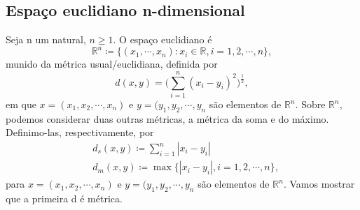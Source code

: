 \documentclass{article}
\begin{document}
\subsection{Espaço euclidiano n-dimensional}
  Seja n um natural, \(n\geq 1.\) O espaço euclidiano é 
    \[
      \mathbb{R}^{n}\coloneqq \{(x_{1}, \cdots, x_{n}): x_{i}\in \mathbb{R}, i = 1, 2, \cdots, n\},
    \]
    munido da métrica usual/euclidiana, definida por 
      \[
        d(x, y) = \biggl(\sum\limits_{i=1}^{n}(x_{i}-y_{i})^{2}\biggr)^{\frac{1}{2}},
      \]
      em que \(x=(x_{1}, x_{2}, \cdots, x_{n})\) e \(y = (y_{1}, y_{2}, \cdots, y_{n}\) são elementos de \(\mathbb{R}^{n}.\)
  Sobre \(\mathbb{R}^{n}\), podemos considerar duas outras métricas, a métrica da soma e do máximo. Definimo-las, respectivamente, por
 \begin{align*}
   &d_{s}(x, y)\coloneqq \sum\limits_{i=1}^{n}|x_{i}-y_{i}|\\
   &d_{m}(x, y)\coloneqq \max\{|x_{i}-y_{i}|, i = 1, 2, \cdots, n\},
 \end{align*}
 para  \(x=(x_{1}, x_{2}, \cdots, x_{n})\) e \(y = (y_{1}, y_{2}, \cdots, y_{n}\) são elementos de \(\mathbb{R}^{n}.\) Vamos mostrar que a primeira d é métrica.
 
\end{document}
